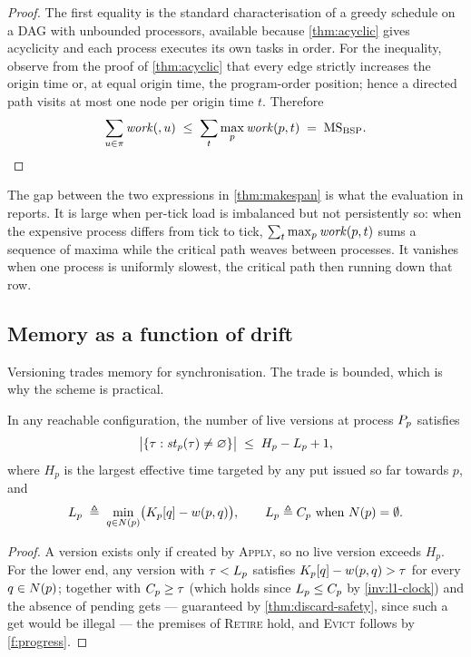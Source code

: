 \begin{proof}
The first equality is the standard characterisation of a greedy schedule on a
DAG with unbounded processors, available because \cref{thm:acyclic} gives
acyclicity and each process executes its own tasks in order. For the inequality,
observe from the proof of \cref{thm:acyclic} that every edge strictly
increases the origin time or, at equal origin time, the program-order
position; hence a directed path visits at most one node per origin time $t$.
Therefore
\[
  \sum_{u \in \pi} \mathit{work}(,u)
  \;\le\; \sum_{t} \max_{p} \mathit{work}(p,t)
  \;=\; \mathrm{MS}_{\mathrm{BSP}} . \qedhere
\]
\end{proof}

\begin{remark}
The gap between the two expressions in \cref{thm:makespan} is what the
evaluation in \cite{dstm2026} reports. It is large when per-tick load is
imbalanced but not persistently so: when the expensive process differs from
tick to tick, $\sum_t \max_p \mathit{work}(p,t)$ sums a sequence of maxima while the
critical path weaves between processes. It vanishes when one process is
uniformly slowest, the critical path then running down that row.
\end{remark}

\subsection{Memory as a function of drift}
\label{sec:sync-space}

Versioning trades memory for synchronisation. The trade is bounded, which is
why the scheme is practical.

\begin{theorem}\label{thm:space-bound}
In any reachable configuration, the number of live versions at process $P_{p}$
satisfies
\[
  \bigl|\{\tau : \mathit{st}_{p}(\tau) \ne \varnothing\}\bigr|
  \;\le\; H_p - L_p + 1,
\]
where $H_p$ is the largest effective time targeted by any put issued so far
towards $p$, and
\[
  L_p \;\triangleq\; \min_{q \in N(p)} \bigl(K_{p}[q] - w(p,q)\bigr),
  \qquad L_p \triangleq C_{p} \text{ when } N(p) = \emptyset .
\]
\end{theorem}

\begin{proof}
A version exists only if created by \textsc{Apply}, so no live version exceeds
$H_p$. For the lower end, any version with $\tau < L_p$ satisfies
$K_{p}[q] - w(p,q) > \tau$ for every $q \in N(p)$; together with
$C_{p} \ge \tau$ (which holds since $L_p \le C_{p}$ by
\cref{inv:l1-clock}) and the absence of pending gets --- guaranteed by
\cref{thm:discard-safety}, since such a get would be illegal --- the premises
of \textsc{Retire} hold, and \textsc{Evict} follows by \ref{f:progress}.
\end{proof}

